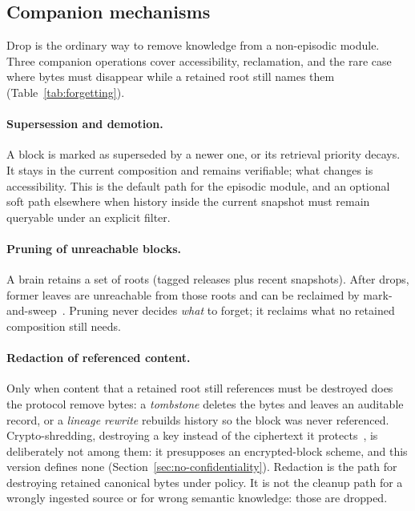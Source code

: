 \documentclass[11pt,a4paper]{article}
\begin{document}
\subsection{Companion mechanisms}

Drop is the ordinary way to remove knowledge from a non-episodic module. Three
companion operations cover accessibility, reclamation, and the rare case where
bytes must disappear while a retained root still names them
(Table~\ref{tab:forgetting}).

\paragraph{Supersession and demotion.}
A block is marked as superseded by a newer one, or its retrieval priority
decays. It stays in the current composition and remains verifiable; what
changes is accessibility. This is the default path for the episodic module,
and an optional soft path elsewhere when history inside the current snapshot
must remain queryable under an explicit filter.

\paragraph{Pruning of unreachable blocks.}
A brain retains a set of roots (tagged releases plus recent snapshots). After
drops, former leaves are unreachable from those roots and can be reclaimed by
mark-and-sweep~\cite{chacon2014git}. Pruning never decides \emph{what} to
forget; it reclaims what no retained composition still needs.

\paragraph{Redaction of referenced content.}
Only when content that a retained root still references must be destroyed does
the protocol remove bytes: a \emph{tombstone} deletes the bytes and leaves an
auditable record, or a \emph{lineage rewrite} rebuilds history so the block
was never referenced. Crypto-shredding, destroying a key instead of the
ciphertext it protects~\cite{nist2014sanitization}, is deliberately not among
them: it presupposes an encrypted-block scheme, and this version defines none
(Section~\ref{sec:no-confidentiality}). Redaction is the path for destroying retained canonical bytes under policy. It is not the cleanup path for a
wrongly ingested source or for wrong semantic knowledge: those are dropped.
\end{document}
